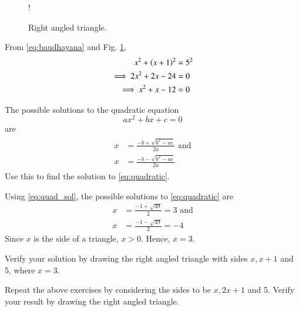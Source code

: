 \documentclass[journal,12pt,twocolumn]{IEEEtran}
\begin{document}
\begin{figure}[!h]
\centering
\resizebox {\columnwidth} {!} {

}
\caption{Right angled triangle.}
\label{fig:rt_triang}
\end{figure}
%
\solution
From \eqref{eq:baudhayana} and Fig. \ref{fig:rt_triang},
\begin{align}
x^2+\left(x+1\right)^2 &= 5^2
\\
\implies 2x^2 + 2x - 24 &=0
\\
\implies x^2 + x - 12 &=0
\label{eq:quadratic}
\end{align}
\begin{problem}
The possible solutions to the quadratic equation
\begin{equation}
ax^2+bx+c = 0
\end{equation}
are
\begin{align}
\label{eq:quad_sol}
\begin{split}
x &= \frac{-b+\sqrt{b^2-ac}}{2a} \text{ and}
\\
x &= \frac{-b-\sqrt{b^2-ac}}{2a} 
\end{split}
\end{align}
Use this to find the solution to \eqref{eq:quadratic}.
\end{problem}
\solution Using \eqref{eq:quad_sol}, the possible solutions to \eqref{eq:quadratic} are
\begin{align}
x &= \frac{-1 + \sqrt{49}}{2} = 3 \text{ and}
\\
x &= \frac{-1 - \sqrt{49}}{2} = -4
\end{align}
%
Since $x$ is the side of a triangle, $x > 0$.  Hence, $x = 3$.
\begin{problem}
Verify your solution by drawing the right angled triangle with sides $x, x+1$ and 5, where $x = 3$.
\end{problem}
\begin{problem}
Repeat the above exercises by considering the sides to be $x, 2x+1$ and 5. Verify your result by drawing the
right angled triangle.
\end{problem}
\end{document}
